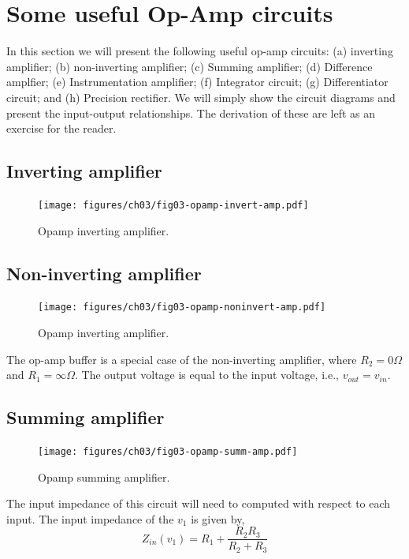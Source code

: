 \section{Some useful Op-Amp circuits}
In this section we will present the following useful op-amp circuits: (a) inverting amplifier; (b) non-inverting amplifier; (c) Summing amplifier; (d) Difference amplfier; (e) Instrumentation amplifier; (f) Integrator circuit; (g) Differentiator circuit; and (h) Precision rectifier. We will simply show the circuit diagrams and present the input-output relationships. The derivation of these are left as an exercise for the reader.

\subsection{Inverting amplifier}
\begin{figure}[htbp]
    \centering
    \texttt{[image: figures/ch03/fig03-opamp-invert-amp.pdf]}
    \caption{Opamp inverting amplifier.}
    \label{fig:03-opamp-inver-amp}
\end{figure}

\subsection{Non-inverting amplifier}

\begin{figure}[htbp]
    \centering
    \texttt{[image: figures/ch03/fig03-opamp-noninvert-amp.pdf]}
    \caption{Opamp inverting amplifier.}
    \label{fig:03-opamp-noninver-amp}
\end{figure}
The op-amp buffer is a special case of the non-inverting amplifier, where $R_2 = 0\Omega$ and $R_1 = \infty\Omega$. The output voltage is equal to the input voltage, i.e., $v_{out} = v_{in}$. 

\subsection{Summing amplifier}
\begin{figure}[htbp]
    \centering
    \texttt{[image: figures/ch03/fig03-opamp-summ-amp.pdf]}
    \caption{Opamp summing amplifier.}
    \label{fig:03-opamp-summ-amp}
\end{figure}
The input impedance of this circuit will need to computed with respect to each input. The input impedance of the $v_1$ is given by,
\begin{equation}
    Z_{in}(v_1) = R_1 + \frac{R_2 R_3}{R_2 + R_3}
    \label{eq:ch03-opamp-summ-amp-rin}
\end{equation}

